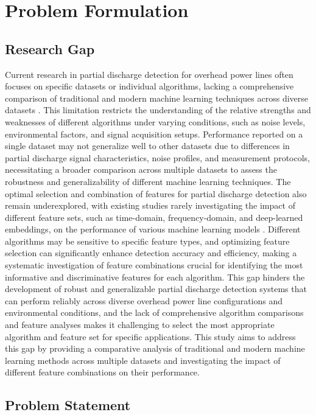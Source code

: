 \section{Problem Formulation}

\subsection{Research Gap}

Current research in partial discharge detection for overhead power lines often focuses on specific datasets or individual algorithms, lacking a comprehensive comparison of traditional and modern machine learning techniques across diverse datasets \parencite{Basharan_2018, Song_2018}. This limitation restricts the understanding of the relative strengths and weaknesses of different algorithms under varying conditions, such as noise levels, environmental factors, and signal acquisition setups. Performance reported on a single dataset may not generalize well to other datasets due to differences in partial discharge signal characteristics, noise profiles, and measurement protocols, necessitating a broader comparison across multiple datasets to assess the robustness and generalizability of different machine learning techniques. The optimal selection and combination of features for partial discharge detection also remain underexplored, with existing studies rarely investigating the impact of different feature sets, such as time-domain, frequency-domain, and deep-learned embeddings, on the performance of various machine learning models \parencite{Long_2024}. Different algorithms may be sensitive to specific feature types, and optimizing feature selection can significantly enhance detection accuracy and efficiency, making a systematic investigation of feature combinations crucial for identifying the most informative and discriminative features for each algorithm. This gap hinders the development of robust and generalizable partial discharge detection systems that can perform reliably across diverse overhead power line configurations and environmental conditions, and the lack of comprehensive algorithm comparisons and feature analyses makes it challenging to select the most appropriate algorithm and feature set for specific applications. This study aims to address this gap by providing a comparative analysis of traditional and modern machine learning methods across multiple datasets and investigating the impact of different feature combinations on their performance.

\subsection{Problem Statement}

